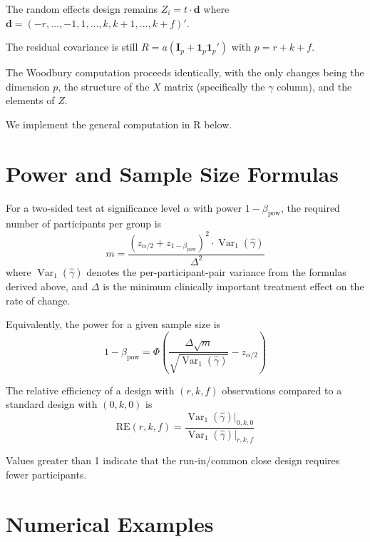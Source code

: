 \documentclass[
]{article}
\begin{document}
The random effects design remains \(Z_i = t \cdot \mathbf{d}\) where
\(\mathbf{d} = (-r,\ldots,-1,1,\ldots,k,k+1,\ldots,k+f)'\).

The residual covariance is still
\(R = a(\mathbf{I}_p + \mathbf{1}_p\mathbf{1}_p')\) with
\(p = r + k + f\).

The Woodbury computation proceeds identically, with the only changes
being the dimension \(p\), the structure of the \(X\) matrix
(specifically the \(\gamma\) column), and the elements of \(Z\).

We implement the general computation in R below.

\section{Power and Sample Size
Formulas}\label{power-and-sample-size-formulas}

For a two-sided test at significance level \(\alpha\) with power
\(1-\beta_{\text{pow}}\), the required number of participants per group
is \begin{equation}
  m = \frac{(z_{\alpha/2} + z_{1-\beta_{\text{pow}}})^2
    \cdot \mathop{\mathrm{Var}}_1(\hat{\gamma})}{\Delta^2}
  \label{eq:sample_size}
\end{equation} where \(\mathop{\mathrm{Var}}_1(\hat{\gamma})\) denotes
the per-participant-pair variance from the formulas derived above, and
\(\Delta\) is the minimum clinically important treatment effect on the
rate of change.

Equivalently, the power for a given sample size is \begin{equation}
  1 - \beta_{\text{pow}} = \Phi\!\left(
    \frac{\Delta\sqrt{m}}
      {\sqrt{\mathop{\mathrm{Var}}_1(\hat{\gamma})}}
    - z_{\alpha/2}
  \right)
  \label{eq:power}
\end{equation}

The relative efficiency of a design with \((r, k, f)\) observations
compared to a standard design with \((0, k, 0)\) is \begin{equation}
  \text{RE}(r, k, f)
  = \frac{\mathop{\mathrm{Var}}_1(\hat{\gamma})\big|_{0,k,0}}
         {\mathop{\mathrm{Var}}_1(\hat{\gamma})\big|_{r,k,f}}
  \label{eq:RE}
\end{equation}

Values greater than 1 indicate that the run-in/common close design
requires fewer participants.

\section{Numerical Examples}\label{numerical-examples}
\end{document}
